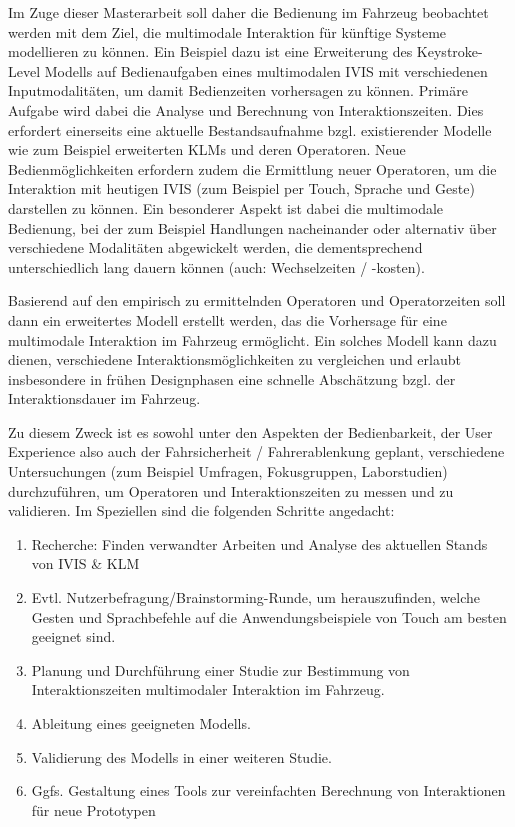 \documentclass[11pt,a4paper,twoside]{book}
\begin{document}
Im Zuge dieser Masterarbeit soll daher die Bedienung im Fahrzeug beobachtet werden mit dem Ziel, die multimodale Interaktion für künftige Systeme modellieren zu können. Ein Beispiel dazu ist eine Erweiterung des Keystroke-Level Modells auf Bedienaufgaben eines multimodalen IVIS mit verschiedenen Inputmodalitäten, um damit Bedienzeiten vorhersagen zu können. Primäre Aufgabe wird dabei die Analyse und Berechnung von Interaktionszeiten. Dies erfordert einerseits eine aktuelle Bestandsaufnahme bzgl. existierender Modelle wie zum Beispiel erweiterten KLMs und deren Operatoren. Neue Bedienmöglichkeiten erfordern zudem die Ermittlung neuer Operatoren, um die Interaktion mit heutigen IVIS (zum Beispiel per Touch, Sprache und Geste) darstellen zu können. Ein besonderer Aspekt ist dabei die multimodale Bedienung, bei der zum Beispiel Handlungen nacheinander oder alternativ über verschiedene Modalitäten abgewickelt werden, die dementsprechend unterschiedlich lang dauern können (auch: Wechselzeiten / -kosten).

Basierend auf den empirisch zu ermittelnden Operatoren und Operatorzeiten soll dann ein erweitertes Modell erstellt werden, das die Vorhersage für eine multimodale Interaktion im Fahrzeug ermöglicht. Ein solches Modell kann dazu dienen, verschiedene Interaktionsmöglichkeiten zu vergleichen und erlaubt insbesondere in frühen Designphasen eine schnelle Abschätzung bzgl. der Interaktionsdauer im Fahrzeug.

Zu diesem Zweck ist es sowohl unter den Aspekten der Bedienbarkeit, der User Experience also auch der Fahrsicherheit / Fahrerablenkung geplant, verschiedene Untersuchungen (zum Beispiel Umfragen, Fokusgruppen, Laborstudien) durchzuführen, um Operatoren und Interaktionszeiten zu messen und zu validieren. Im Speziellen sind die folgenden Schritte angedacht:

\begin{enumerate}
\item Recherche: Finden verwandter Arbeiten und Analyse des aktuellen Stands von IVIS \& KLM 
\item Evtl. Nutzerbefragung/Brainstorming-Runde, um herauszufinden, welche Gesten und Sprachbefehle auf die Anwendungsbeispiele von Touch am besten geeignet sind. 
\item Planung und Durchführung einer Studie zur Bestimmung von Interaktionszeiten multimodaler Interaktion im Fahrzeug. 
\item Ableitung eines geeigneten Modells. 
\item Validierung des Modells in einer weiteren Studie. 
\item Ggfs. Gestaltung eines Tools zur vereinfachten Berechnung von Interaktionen für neue Prototypen 
\end{enumerate}
\end{document}

